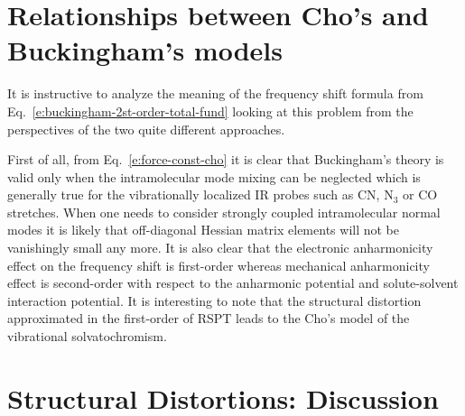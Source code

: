 \documentclass[a4paper,titlepage,twoside,fleqn,12pt]{book}
\begin{document}
\begin{refsection}
\section{Relationships between Cho's and Buckingham's models}

It is instructive to analyze the meaning of the frequency shift
formula from Eq.~\eqref{e:buckingham-2st-order-total-fund}
looking at this problem from the perspectives of the two quite different approaches.

First of all, from Eq.~\eqref{e:force-const-cho} it is clear 
that Buckingham's theory is valid only
when the intramolecular mode mixing can be neglected which
is generally true for the vibrationally localized IR probes
such as CN, N$_3$ or CO stretches. When one needs to consider
strongly coupled intramolecular normal modes it is likely
that off-diagonal Hessian matrix elements will not be vanishingly
small any more. It is also
clear that the electronic anharmonicity effect on the frequency 
shift is first\hyp{}order
whereas mechanical anharmonicity effect is second\hyp{}order 
with respect to the anharmonic potential and solute\hyp{}solvent
interaction potential. It is interesting to note 
that the structural distortion approximated
in the first\hyp{}order of RSPT leads to the Cho's model of the vibrational
solvatochromism. 

\section{Structural Distortions: Discussion \label{s:str-dist-general-discussion}}


\end{refsection}
\end{document}
